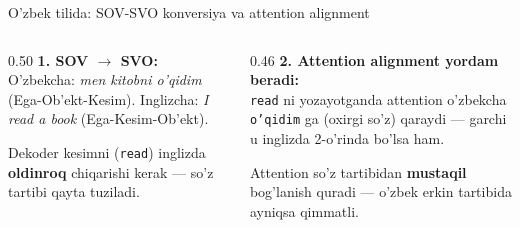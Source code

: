 \documentclass[aspectratio=169,11pt]{beamer}
\begin{document}
\begin{frame}{O'zbek tilida: SOV-SVO konversiya va attention alignment}
  \begin{columns}[T]
    \begin{column}{0.50\textwidth}
      \textbf{1. SOV $\to$ SVO:}\\[3pt]
      \small
      O'zbekcha: \textit{men kitobni o'qidim} (Ega-Ob'ekt-Kesim).
      Inglizcha: \textit{I read a book} (Ega-Kesim-Ob'ekt).
      \begin{tcolorbox}[warnbox,title=Qiyinchilik,top=2pt,bottom=2pt]
        \footnotesize
        Dekoder kesimni (\texttt{read}) inglizda \textbf{oldinroq} chiqarishi kerak
        --- so'z tartibi qayta tuziladi.
      \end{tcolorbox}
    \end{column}
    \begin{column}{0.46\textwidth}
      \textbf{2. Attention alignment yordam beradi:}\\[3pt]
      \small
      \texttt{read} ni yozayotganda attention o'zbekcha \texttt{o'qidim} ga
      (oxirgi so'z) qaraydi --- garchi u inglizda 2-o'rinda bo'lsa ham.
      \begin{tcolorbox}[okbox,top=2pt,bottom=2pt]
        \footnotesize
        Attention so'z tartibidan \textbf{mustaqil} bog'lanish quradi --- o'zbek
        erkin tartibida ayniqsa qimmatli.
      \end{tcolorbox}
    \end{column}
  \end{columns}
\end{frame}
\end{document}
